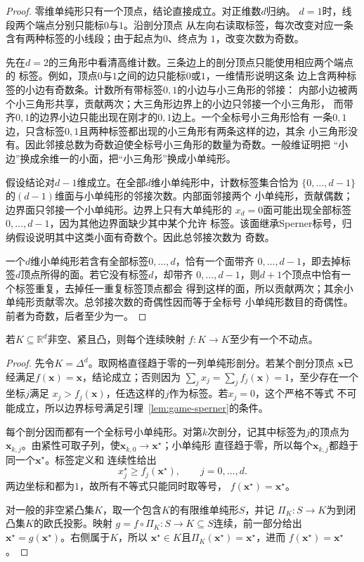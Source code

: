\begin{proof}
零维单纯形只有一个顶点，结论直接成立。对正维数\(d\)归纳。
\(d=1\)时，线段两个端点分别只能标\(0\)与\(1\)。沿剖分顶点
从左向右读取标签，每次改变对应一条含有两种标签的小线段；由于起点为\(0\)、终点为
\(1\)，改变次数为奇数。

先在\(d=2\)的三角形中看清高维计数。三条边上的剖分顶点只能使用相应两个端点的
标签。例如，顶点\(0\)与\(1\)之间的边只能标\(0\)或\(1\)，一维情形说明这条
边上含两种标签的小边有奇数条。计数所有带标签\(0,1\)的小边与小三角形的邻接：
内部小边被两个小三角形共享，贡献两次；大三角形边界上的小边只邻接一个小三角形，
而带齐\(0,1\)的边界小边只能出现在刚才的\(0,1\)边上。一个全标号小三角形恰有
一条\(0,1\)边，只含标签\(0,1\)且两种标签都出现的小三角形有两条这样的边，其余
小三角形没有。因此邻接总数为奇数迫使全标号小三角形的数量为奇数。一般维证明把
“小边”换成余维一的小面，把“小三角形”换成小单纯形。

假设结论对\(d-1\)维成立。在全部\(d\)维小单纯形中，计数标签集合恰为
\(\{0,\ldots,d-1\}\)的\((d-1)\)维面与小单纯形的邻接次数。内部面邻接两个
小单纯形，贡献偶数；边界面只邻接一个小单纯形。边界上只有大单纯形的
\(x_d=0\)面可能出现全部标签\(0,\ldots,d-1\)，因为其他边界面缺少其中某个允许
标签。该面继承Sperner标号，归纳假设说明其中这类小面有奇数个。因此总邻接次数为
奇数。

一个\(d\)维小单纯形若含有全部标签\(0,\ldots,d\)，恰有一个面带齐
\(0,\ldots,d-1\)，即去掉标签\(d\)顶点所得的面。若它没有标签\(d\)，却带齐
\(0,\ldots,d-1\)，则\(d+1\)个顶点中恰有一个标签重复，去掉任一重复标签顶点都会
得到这样的面，所以贡献两次；其余小单纯形贡献零次。总邻接次数的奇偶性因而等于全标号
小单纯形数目的奇偶性。前者为奇数，后者至少为一。
\end{proof}

\begin{theorem}[Brouwer不动点定理]
\label{thm:game-brouwer}
若\(K\subseteq\mathbb{R}^d\)非空、紧且凸，则每个连续映射
\(f:K\to K\)至少有一个不动点。
\end{theorem}

\begin{proof}
先令\(K=\Delta^d\)。取网格直径趋于零的一列单纯形剖分。若某个剖分顶点
\(\bm{x}\)已经满足\(f(\bm{x})=\bm{x}\)，结论成立；否则因为
\(\sum_jx_j=\sum_jf_j(\bm{x})=1\)，至少存在一个坐标\(j\)满足
\(x_j>f_j(\bm{x})\)，任选这样的\(j\)作为标签。若\(x_j=0\)，这个严格不等式
不可能成立，所以边界标号满足引理~\ref{lem:game-sperner}的条件。

每个剖分因而都有一个全标号小单纯形。对第\(k\)次剖分，记其中标签为\(j\)的顶点为
\(\bm{x}_{k,j}\)。由紧性可取子列，使\(\bm{x}_{k,0}\to\bm{x}^\star\)；小单纯形
直径趋于零，所以每个\(\bm{x}_{k,j}\)都趋于同一个\(\bm{x}^\star\)。标签定义和
连续性给出
\[
  x_j^\star\geq f_j(\bm{x}^\star),
  \qquad j=0,\ldots,d.
\]
两边坐标和都为\(1\)，故所有不等式只能同时取等号，
\(f(\bm{x}^\star)=\bm{x}^\star\)。

对一般的非空紧凸集\(K\)，取一个包含\(K\)的有限维单纯形\(S\)，并记
\(\Pi_K:S\to K\)为到闭凸集\(K\)的欧氏投影。映射
\(g=f\circ\Pi_K:S\to K\subseteq S\)连续，前一部分给出
\(\bm{x}^\star=g(\bm{x}^\star)\)。右侧属于\(K\)，所以
\(\bm{x}^\star\in K\)且\(\Pi_K(\bm{x}^\star)=\bm{x}^\star\)，进而
\(f(\bm{x}^\star)=\bm{x}^\star\)。
\end{proof}

